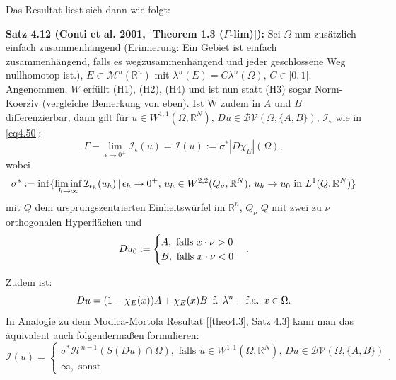 Das Resultat liest sich dann wie folgt:\\[0.5cm]
\colorbox{generalYellow}{\begin{minipage}{16cm}{\textcolor{black}{}{\label{theo4.12}}}
\textbf{Satz 4.12 (Conti et al. 2001, \cite{ContiTwoGradientPhase}[Theorem 1.3 (\(\Gamma\)-lim)]):} Sei \(\Omega\) nun zusätzlich einfach zusammenhängend (Erinnerung: Ein Gebiet ist einfach zusammenhängend, falls es wegzusammenhängend und jeder geschlossene Weg nullhomotop ist.), \(E \subset \mathcal{M}^n(\mathbb{R}^n)\) mit \(\lambda^n(E) = C \lambda^n(\Omega), \, C \in ]0,1[\). Angenommen, \(W\) erfüllt (H1), (H2), (H4) und ist nun statt (H3) sogar Norm-Koerziv (vergleiche Bemerkung von eben). Ist W zudem in \(A\) und \(B\) differenzierbar, dann gilt für \(u \in W^{1,1}(\Omega, \mathbb{R}^N), \, Du \in \mathcal{BV}(\Omega, \{A,B\})\), \(\mathcal{I}_{\epsilon}\) wie in \eqref{eq4.50}:
\begin{equation}
    \Gamma-\lim_{\epsilon \to 0^+} \mathcal{I}_{\epsilon} (u) = \mathcal{I}(u) := \sigma^* |D\chi_E|(\Omega),
\end{equation}
wobei 
\begin{equation}{\label{eq4.59}}
    \sigma^* := \inf \{\liminf_{h \to \infty} \mathcal{I}_{\epsilon_h} (u_h) \, | \, \epsilon_h \to 0^+, \, u_h \in W^{2,2}(Q_{\nu},\mathbb{R}^N), \, u_h \to u_0 \text{ in }L^1(Q,\mathbb{R}^N)\}
\end{equation}
mit \(Q\) dem ursprungszentrierten Einheitswürfel im \(\mathbb{R}^n\), \(Q_{\nu}\) \(Q\) mit zwei zu \(\nu\) orthogonalen Hyperflächen und 
\begin{equation}{\label{eq4.60}}
    Du_0 := \begin{cases}
        A, \text{ falls }x \cdot \nu > 0 \\
        B, \text{ falls }x \cdot \nu < 0
    \end{cases}.
\end{equation}
\end{minipage}}
\newpage
{}\colorbox{generalYellow}{\begin{minipage}{16cm}{\textcolor{black}{}{\label{theo4.12b}}}
Zudem ist:
\begin{equation}{\label{eq4.61}}
    Du = (1 - \chi_E(x))A + \chi_E(x)B \, \text{ f. }\lambda^n- \text{f.a. }x \in \Omega.
\end{equation}
In Analogie zu dem Modica-Mortola Resultat [\ref{theo4.3}, Satz 4.3] kann man das äquivalent auch folgendermaßen formulieren:
\begin{equation}
    \mathcal{I}(u) = \begin{cases}
        \sigma^* \mathcal{H}^{n-1} (S(Du) \cap \Omega), \text{ falls }u \in W^{1,1}(\Omega,\mathbb{R}^N), \, Du \in \mathcal{BV}(\Omega,\{A,B\}) \\
        \infty, \text{ sonst}
    \end{cases}.
\end{equation}
\end{minipage}}

